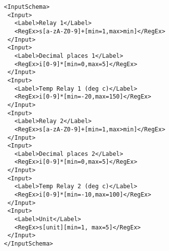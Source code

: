 \iffalse
\begin{algorithm}[t]
\footnotesize
\DontPrintSemicolon
\KwIn{Set of subset of fields $G$ returned from Algorithm~\ref{algo:makeGroup}}
\KwOut{Set of webpages $P'$}
\Begin
{
    $P' \leftarrow$ initialize empty set of webpages\\
    \For{$\forall g \in G$} {
    $p \leftarrow$ initialize new empty webpage\\
        \If{$g$ is not empty}{
            $p.add(g.first())$\\
            $g(g.deleteFirst())$
        }
        $P'.add(p)$
    }
    \While{\texttt{true}}
    {
        \For{$p_{out} \in P'$}
        {
            \For{$p_{in} \in P'$}
            {
                \If{$p_{in} \neq p_{out} \wedge p_{in} \& p_{in}$ interchangeable}
                {
                    $newPage \leftarrow$ create new page\\
                    $p_{tmp}.add(p_{in}.first())$\\
                    $p_{in}.deleteFirst()$\\
                    $P'.add(newPage)$
                }
            }
        }
    }
    return $P'$
}
\caption{Server-side mechanism to produce webpages that prevents label swapping attack}
\label{algo:makePages}
\end{algorithm}
\fi

\begin{figure}[t]
\footnotesize
\begin{lstlisting}[mathescape=true]
<InputSchema>
 <Input>
   <Label>Relay 1</Label>
   <RegEx>s[a-zA-Z0-9]+[min=1,max>min]</RegEx>
 </Input>
 <Input>
   <Label>Decimal places 1</Label>
   <RegEx>i[0-9]*[min=0,max=5]</RegEx>
 </Input>
 <Input>
   <Label>Temp Relay 1 (deg c)</Label>
   <RegEx>i[0-9]*[min=-20,max=150]</RegEx>
 </Input>
 <Input>
   <Label>Relay 2</Label>
   <RegEx>s[a-zA-Z0-9]+[min=1,max>min]</RegEx>
 </Input>
 <Input>
   <Label>Decimal places 2</Label>
   <RegEx>i[0-9]*[min=0,max=5]</RegEx>
 </Input>
 <Input>
   <Label>Temp Relay 2 (deg c)</Label>
   <RegEx>i[0-9]*[min=-10,max=100]</RegEx>
 </Input>
 <Input>
   <Label>Unit</Label>
   <RegEx>s[unit][min=1, max=5]</RegEx>
 </Input>
</InputSchema>
\end{lstlisting} 
\end{figure}


